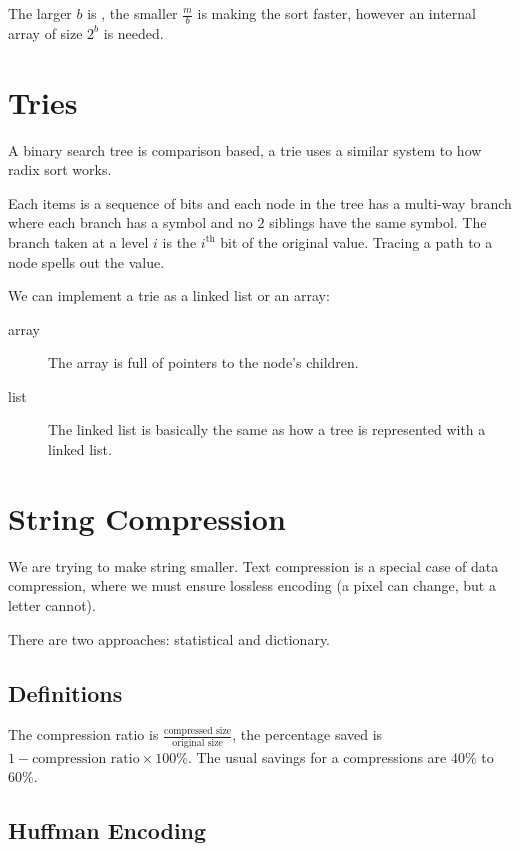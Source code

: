 \begin{note}
    The larger \(b\) is , the smaller \(\frac{m}{b}\) is making the sort faster, however an internal array of size \(2^{b}\) is needed.
\end{note}

\section{Tries}\label{sec:tries}

A binary search tree is comparison based, a trie uses a similar system to how radix sort works.

Each items is a sequence of bits and each node in the tree has a multi-way branch where each branch has a symbol and no \(2\) siblings have the same symbol.
The branch taken at a level \(i\) is the \(i^{\text{th}}\) bit of the original value.
Tracing a path to a node spells out the value.

We can implement a trie as a linked list or an array:
\begin{description}
    \item[array] The array is full of pointers to the node's children.
    \item[list] The linked list is basically the same as how a tree is represented with a linked list.
\end{description}

\section{String Compression}\label{sec:string_compression}

We are trying to make string smaller.
Text compression is a special case of data compression, where we must ensure lossless encoding (a pixel can change, but a letter cannot).

There are two approaches: statistical and dictionary.

\subsection{Definitions}\label{sub:definitions}

The compression ratio is \(\frac{\text{compressed size}}{\text{original size}}\), the percentage saved is \(1-\text{compression ratio} \times 100\%\).
The usual savings for a compressions are \(40\%\) to \(60\%\).

\subsection{Huffman Encoding}\label{sub:huffman_encoding}

